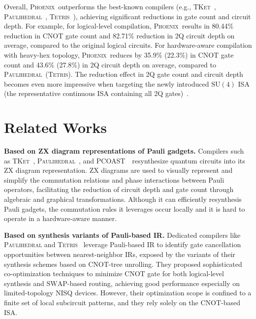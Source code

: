 \documentclass[conference,9pt]{IEEEtran}
\newcommand{\phoenix}{\textsc{Phoenix}}
\newcommand{\tket}{\textsc{TKet}}
\newcommand{\tetris}{\textsc{Tetris}}
\newcommand{\paulihedral}{\textsc{Paulihedral}}
\newcommand{\pauliopt}{\textsc{Paulihedral}}
\newcommand{\pcoast}{\textsc{PCOAST}}
\newcommand{\SWAP}{\mathrm{SWAP}}
\newcommand{\CNOT}{\mathrm{CNOT}}
\newcommand{\SUfour}{\mathrm{SU}(4)}
\begin{document}
    Overall, \phoenix\ outperforms the best-known compilers (e.g., \tket~\cite{sivarajah2020t}, \paulihedral~\cite{li2022paulihedral}, \tetris~\cite{jin2024tetris}), achieving significant reductions in gate count and circuit depth. For example, for logical-level compilation, \phoenix\ results in 80.44\% reduction in $ \CNOT $ gate count and 82.71\% reduction in 2Q circuit depth on average, compared to the original logical circuits. For hardware-aware compilation with heavy-hex topology, \phoenix\ reduces by 35.9\% (22.3\%) in $ \CNOT $ gate count and 43.6\% (27.8\%) in 2Q circuit depth on average, compared to \paulihedral\ (\tetris). The reduction effect in 2Q gate count and circuit depth becomes even more impressive when targeting the newly introduced $ \SUfour $ ISA (the representative continuous ISA containing all 2Q gates)~\cite{chen2024one}.








\section{Related Works}

    \textbf{Based on ZX diagram representations of Pauli gadgets.} Compilers such as \tket~\cite{sivarajah2020t,cowtan2019phase}, \pauliopt~\cite{van2023towards}, and \pcoast~\cite{paykin2023pcoast}\ resynthesize quantum circuits into its ZX diagram representation. ZX diagrams are used to visually represent and simplify the commutation relations and phase interactions between Pauli operators, facilitating the reduction of circuit depth and gate count through algebraic and graphical transformations. Although it can efficiently resynthesis Pauli gadgets, the commutation rules it leverages occur locally and it is hard to operate in a hardware-aware manner.



    \textbf{Based on synthesis variants of Pauli-based IR.} Dedicated compilers like \paulihedral\cite{li2022paulihedral} and \tetris~\cite{jin2024tetris} leverage Pauli-based IR to identify gate cancellation opportunities between nearest-neighbor IRs, exposed by the variants of their synthesis schemes based on $\CNOT$-tree unrolling. They proposed sophisticated co-optimization techniques to minimize $ \CNOT $ gate for both logical-level synthesis and $\SWAP$-based routing, achieving good performance especially on limited-topology NISQ devices. However, their optimization scope is confined to a finite set of local subcircuit patterns, and they rely solely on the $ \CNOT $-based ISA.
\end{document}
